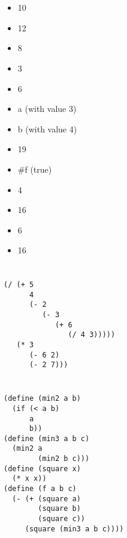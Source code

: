 \documentclass[../main.tex]{subfiles}
\begin{document}

\section{}

\begin{multicols}{2}
  \begin{itemize}
    \item 10
    \item 12
    \item 8
    \item 3
    \item 6
    \item a (with value 3)
    \item b (with value 4)
    \item 19
    \item \#f (true)
    \item 4
    \item 16
    \item 6
    \item 16
  \end{itemize}
\end{multicols}


\section{}

\begin{lstlisting}
(/ (+ 5
      4
      (- 2
         (- 3
            (+ 6
               (/ 4 3)))))
   (* 3
      (- 6 2)
      (- 2 7)))
\end{lstlisting}


\section{}

\begin{lstlisting}
(define (min2 a b)
  (if (< a b)
      a
      b))
(define (min3 a b c)
  (min2 a
        (min2 b c)))
(define (square x)
  (* x x))
(define (f a b c)
  (- (+ (square a)
        (square b)
        (square c))
     (square (min3 a b c))))
\end{lstlisting}


\section{}
\end{document}

